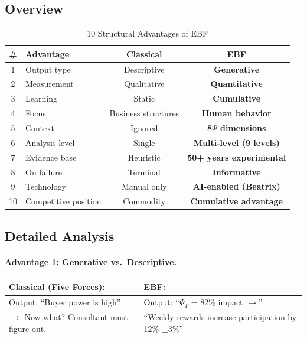 \subsection{Overview}

\begin{table}[htbp]
\centering
\caption{10 Structural Advantages of EBF}
\label{tab:10-advantages}
\renewcommand{\arraystretch}{1.3}
\begin{tabular}{@{}clcc@{}}
\toprule
\textbf{\#} & \textbf{Advantage} & \textbf{Classical} & \textbf{EBF} \\
\midrule
1 & Output type & Descriptive & \textbf{Generative} \\
2 & Measurement & Qualitative & \textbf{Quantitative} \\
3 & Learning & Static & \textbf{Cumulative} \\
4 & Focus & Business structures & \textbf{Human behavior} \\
5 & Context & Ignored & \textbf{8$\Psi$ dimensions} \\
6 & Analysis level & Single & \textbf{Multi-level (9 levels)} \\
7 & Evidence base & Heuristic & \textbf{50+ years experimental} \\
8 & On failure & Terminal & \textbf{Informative} \\
9 & Technology & Manual only & \textbf{AI-enabled (Beatrix)} \\
10 & Competitive position & Commodity & \textbf{Cumulative advantage} \\
\bottomrule
\end{tabular}
\end{table}

\subsection{Detailed Analysis}

\paragraph{Advantage 1: Generative vs.\ Descriptive.}

\begin{center}
\begin{tabular}{@{}p{6.5cm}p{6.5cm}@{}}
\textbf{Classical (Five Forces):} & \textbf{EBF:} \\
\midrule
Output: ``Buyer power is high'' & Output: ``$\Psi_T$ = 82\% impact $\rightarrow$'' \\
$\rightarrow$ Now what? Consultant must figure out. & ``Weekly rewards increase participation by 12\% $\pm$3\%'' \\
\end{tabular}
\end{center}

